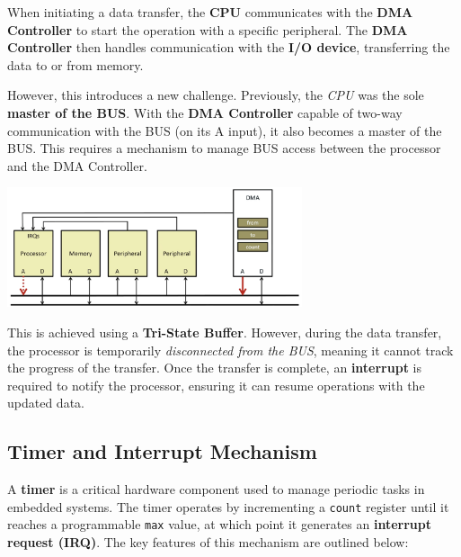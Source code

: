 When initiating a data transfer, the \textbf{CPU} communicates with the \textbf{DMA Controller} to start the operation with a specific peripheral. The \textbf{DMA Controller} then handles communication with the \textbf{I/O device}, transferring the data to or from memory. 

\vspace{0.5cm}
\noindent
However, this introduces a new challenge. Previously, the \textit{CPU} was the sole \textbf{master of the BUS}. With the \textbf{DMA Controller} capable of two-way communication with the BUS (on its A input), it also becomes a master of the BUS. This requires a mechanism to manage BUS access between the processor and the DMA Controller.
\vspace{1cm}
\begin{center}
    \includegraphics[width=0.65\textwidth]{chapters/chapter2c/images/DMA3.png}
\end{center}
\vspace{0.5cm}
\noindent
This is achieved using a \textbf{Tri-State Buffer}. However, during the data transfer, the processor is temporarily \textit{disconnected from the BUS}, meaning it cannot track the progress of the transfer. Once the transfer is complete, an \textbf{interrupt} is required to notify the processor, ensuring it can resume operations with the updated data.
\newpage
\subsection{Timer and Interrupt Mechanism}

A \textbf{timer} is a critical hardware component used to manage periodic tasks in embedded systems. The timer operates by incrementing a \texttt{count} register until it reaches a programmable \texttt{max} value, at which point it generates an \textbf{interrupt request (IRQ)}. The key features of this mechanism are outlined below:


